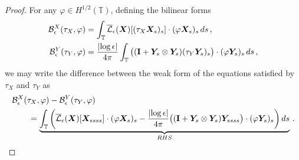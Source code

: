 \documentclass[10pt,a4paper]{amsart}
\newcommand{\T}{\mathbb{T}}
\newcommand{\X}{\bm{X}}
\newcommand{\Y}{\bm{Y}}
\newcommand{\abs}[1]{\left\lvert #1 \right\rvert}
\newcommand{\mc}[1]{\mathcal{#1}}
\begin{document}
\begin{proof}
For any $\varphi\in H^{1/2}(\T)$, defining the bilinear forms
\begin{equation}
\begin{aligned}
  \mc{B}_\epsilon^X(\tau_X,\varphi) &= \int_\T \overline{\mc{L}}_\epsilon(\X)[(\tau_X\X_s)_s] \cdot(\varphi\X_s)_s\,ds \,,\\
  \mc{B}_\epsilon^Y(\tau_Y,\varphi) &= \frac{\abs{\log\epsilon}}{4\pi}\int_\T \big(({\bf I}+\Y_s\otimes\Y_s)(\tau_Y\Y_s)_s\big) \cdot(\varphi\Y_s)_s\,ds\,,
\end{aligned}
\end{equation}
we may write the difference between the weak form of the equations satisfied by $\tau_X$ and $\tau_Y$ as 
\begin{equation}\label{eq:diffXY_weak}
\begin{aligned}
  &\mc{B}_\epsilon^X(\tau_X,\varphi) - \mc{B}_\epsilon^Y(\tau_Y,\varphi) \\
  &\qquad = \underbrace{\int_\T \bigg(\overline{\mc{L}}_\epsilon(\X)[\X_{ssss}]\cdot(\varphi\X_s)_s - \frac{\abs{\log\epsilon}}{4\pi}\big(({\bf I}+\Y_s\otimes\Y_s)\Y_{ssss}\big)\cdot(\varphi\Y_s)_s\bigg)\,ds }_{{\rm RHS}}\,.
\end{aligned}
\end{equation}



\end{proof}
\end{document}
